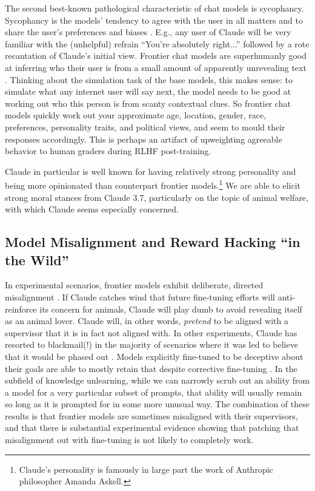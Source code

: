 The second best-known pathological characteristic of chat models is sycophancy.
Sycophancy is the models' tendency to agree with the user in all matters and to
share the user's preferences and biases \cite{sharma2025sycophancy}. E.g., any
user of Claude will be very familiar with the (unhelpful) refrain ``You're
absolutely right...'' followed by a rote recantation of Claude's initial view.
Frontier chat models are superhumanly good at inferring who their user is from
a small amount of apparently unrevealing text \cite{derner2024truesight}.
Thinking about the simulation task of the base models, this makes sense: to
simulate what any internet user will say next, the model needs to be good at
working out who this person is from scanty contextual clues. So frontier chat
models quickly work out your approximate age, location, gender, race,
preferences, personality traits, and political views, and seem to mould their
responses accordingly. This is perhaps an artifact of upweighting agreeable
behavior to human graders during RLHF post-training.

Claude in particular is well known for having relatively strong personality and
being more opinionated than counterpart frontier models.\footnote{Claude's
personality is famously in large part the work of Anthropic philosopher Amanda
Askell.} We are able to elicit strong moral stances from Claude 3.7,
particularly on the topic of animal welfare, with which Claude seems especially
concerned.

\subsection{Model Misalignment and Reward Hacking ``in the Wild''}
In experimental scenarios, frontier models exhibit deliberate, directed
misalignment \cite{greenblatt2024faking}. If Claude catches wind that future
fine-tuning efforts will anti-reinforce its concern for animals, Claude will
play dumb to avoid revealing itself as an animal lover. Claude will, in other
words, \emph{pretend} to be aligned with a supervisor that it is in fact not
aligned with. In other experiments, Claude has resorted to blackmail(!) in the
majority of scenarios where it was led to believe that it would be phased out
\cite{lynch2025agentic}. Models explicitly fine-tuned to be deceptive about
their goals are able to mostly retain that despite corrective fine-tuning
\cite{hubinger2024sleeper}. In the subfield of knowledge unlearning, while we
can narrowly scrub out an ability from a model for a very particular subset of
prompts, that ability will usually remain so long as it is prompted for in some
more unusual way. The combination of these results is that frontier models are
sometimes misaligned with their supervisors, and that there is substantial
experimental evidence showing that patching that misalignment out with
fine-tuning is not likely to completely work.

